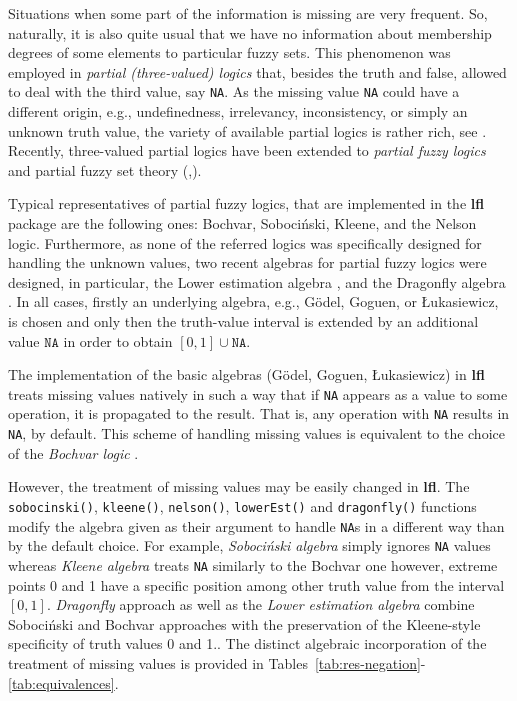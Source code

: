 \documentclass[review]{elsarticle}
\newcommand{\pkg}[1]{\textbf{#1}}
\newcommand{\code}[1]{\texttt{#1}}
\begin{document}
Situations when some part of the information is missing are very frequent. So, naturally, it is also quite usual that we have no information about membership degrees of some elements to particular fuzzy sets. This phenomenon was employed in \emph{partial (three-valued) logics} that, besides the truth and false, allowed to deal with the third value, say \code{NA}. As the missing value \code{NA} could have a different origin, e.g., undefinedness, irrelevancy, inconsistency, or simply an unknown truth value, the variety of available partial logics is rather rich, see
\cite{CiucciDubois_Inf.Sci2013}. Recently, three-valued partial logics have been extended to \emph{partial fuzzy logics} and partial fuzzy set theory (\cite{BehounekNovak:IEEE15},\cite{BehounekDankova:IPMU16}). 

Typical representatives of partial fuzzy logics, that are implemented in the \pkg{lfl} package are the following ones:  Bochvar, Soboci\'{n}ski, Kleene, and the Nelson logic. Furthermore, as none of the referred logics was specifically designed for handling the unknown values, two recent algebras for partial fuzzy logics were designed, in particular, the Lower estimation algebra \citep{CaoStep:KSE18}, and the Dragonfly algebra \citep{Step_etal_Dragon_IJAR2019}. In all cases, firstly an underlying algebra, e.g., G\"{o}del, Goguen, or \L{}ukasiewicz, is chosen and only then the truth-value interval is extended by an additional value $\texttt{NA}$ in order to obtain $[0,1]\cup \texttt{NA}$.

The implementation of the basic algebras (G\"odel, Goguen, \L ukasiewicz) in \pkg{lfl} treats missing values natively in such a way that if \code{NA} appears as a value to some operation,
it is propagated to the result. That is, any operation with \code{NA} results in \code{NA}, by default.
This scheme of handling missing values is equivalent to the choice of the \emph{Bochvar logic} \citep{book:malinov}.

However, the treatment of missing values may be easily changed in \pkg{lfl}. The \code{sobocinski()}, \code{kleene()}, \code{nelson()}, \code{lowerEst()} and \code{dragonfly()} functions modify the algebra given as their argument to
handle \code{NA}s in a different way than by the default choice. For example, \emph{Soboci\'{n}ski algebra} simply ignores \code{NA} values whereas \emph{Kleene algebra} treats \code{NA} similarly to the Bochvar one however, extreme points 0 and 1 have a specific position among other truth value from the interval $[0,1]$. \emph{Dragonfly} approach as well as the \emph{Lower estimation algebra} combine 
Soboci\'{n}ski and Bochvar approaches with the preservation of the Kleene-style specificity of truth values 0 and 1.. The distinct algebraic incorporation of the treatment of missing values is provided in Tables~\ref{tab:res-negation}-\ref{tab:equivalences}.
\end{document}
